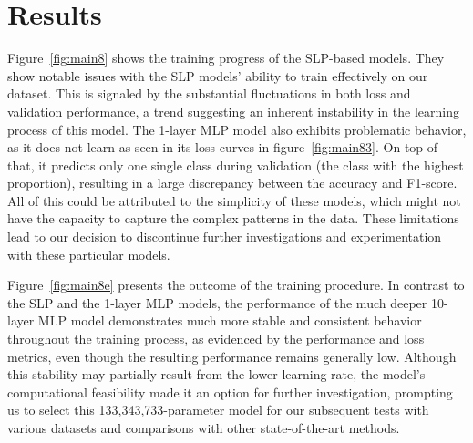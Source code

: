 \section{Results}
Figure~\ref{fig:main8} shows the training progress of the SLP-based models. They show notable issues with the SLP models' ability to train effectively on our dataset. This is signaled by the substantial fluctuations in both loss and validation performance, a trend suggesting an inherent instability in the learning process of this model. The 1-layer MLP model also exhibits problematic behavior, as it does not learn as seen in its loss-curves in figure~\ref{fig:main83}. On top of that, it predicts only one single class during validation (the class with the highest proportion), resulting in a large discrepancy between the accuracy and F1-score. All of this could be attributed to the simplicity of these models, which might not have the capacity to capture the complex patterns in the data. These limitations lead to our decision to discontinue further investigations and experimentation with these particular models.

Figure~\ref{fig:main8e} presents the outcome of the training procedure. In contrast to the SLP and the 1-layer MLP models, the performance of the much deeper 10-layer MLP model demonstrates much more stable and consistent behavior throughout the training process, as evidenced by the performance and loss metrics, even though the resulting performance remains generally low. Although this stability may partially result from the lower learning rate, the model's computational feasibility made it an option for further investigation, prompting us to select this 133,343,733-parameter model for our subsequent tests with various datasets and comparisons with other state-of-the-art methods.

